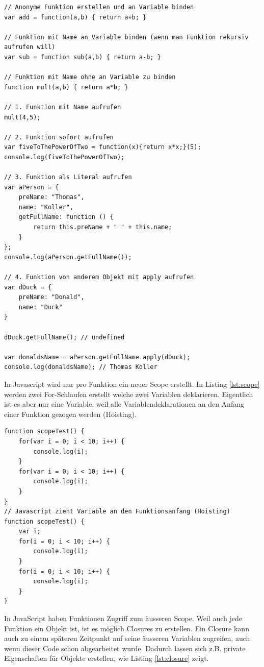 \begin{lstlisting}[label=lst:methoden-aufruf,caption=Methoden aufrufen]
// Anonyme Funktion erstellen und an Variable binden
var add = function(a,b) { return a+b; }

// Funktion mit Name an Variable binden (wenn man Funktion rekursiv aufrufen will)
var sub = function sub(a,b) { return a-b; }

// Funktion mit Name ohne an Variable zu binden
function mult(a,b) { return a*b; }

// 1. Funktion mit Name aufrufen
mult(4,5);

// 2. Funktion sofort aufrufen
var fiveToThePowerOfTwo = function(x){return x*x;}(5);
console.log(fiveToThePowerOfTwo);

// 3. Funktion als Literal aufrufen
var aPerson = {
	preName: "Thomas",
	name: "Koller",
	getFullName: function () {
		return this.preName + " " + this.name;
	}
};
console.log(aPerson.getFullName());

// 4. Funktion von anderem Objekt mit apply aufrufen
var dDuck = {
	preName: "Donald",
	name: "Duck"
}

dDuck.getFullName(); // undefined

var donaldsName = aPerson.getFullName.apply(dDuck);
console.log(donaldsName); // Thomas Koller
\end{lstlisting}

In Javascript wird nur pro Funktion ein neuer Scope erstellt. In Listing \ref{lst:scope} werden zwei For-Schlaufen erstellt welche zwei Variablen deklarieren. Eigentlich ist es aber nur eine Variable, weil alle Variablendeklarationen an den Anfang einer Funktion gezogen werden (Hoisting).

\newpage

\begin{lstlisting}[label=lst:scope,caption=Scope]
function scopeTest() {
	for(var i = 0; i < 10; i++) {
		console.log(i);
	}
	for(var i = 0; i < 10; i++) {
		console.log(i);
	}
}
// Javascript zieht Variable an den Funktionsanfang (Hoisting)
function scopeTest() {
	var i;
	for(i = 0; i < 10; i++) {
		console.log(i);
	}
	for(i = 0; i < 10; i++) {
		console.log(i);
	}
}
\end{lstlisting}

In JavaScript haben Funktionen Zugriff zum äusseren Scope. Weil auch jede Funktion ein Objekt ist, ist es möglich Closures zu erstellen. Ein Closure kann auch zu einem späteren Zeitpunkt auf seine äusseren Variablen zugreifen, auch wenn dieser Code schon abgearbeitet wurde. Dadurch lassen sich z.B. private Eigenschaften für Objekte erstellen, wie Listing \ref{lst:closure} zeigt.

